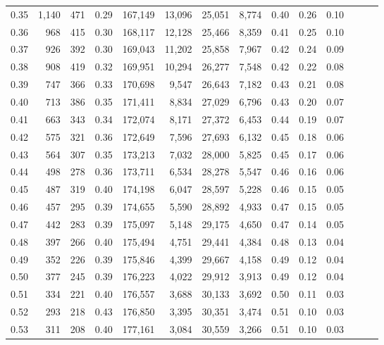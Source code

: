 \begin{tabular}{rrrrrrrrrrrrrr}
0.35 &  1,140 &    471 &  0.29 &  167,149 &   13,096 &  25,051 &   8,774 &  0.40 &  0.26 &      0.10 \\
0.36 &    968 &    415 &  0.30 &  168,117 &   12,128 &  25,466 &   8,359 &  0.41 &  0.25 &      0.10 \\
0.37 &    926 &    392 &  0.30 &  169,043 &   11,202 &  25,858 &   7,967 &  0.42 &  0.24 &      0.09 \\
0.38 &    908 &    419 &  0.32 &  169,951 &   10,294 &  26,277 &   7,548 &  0.42 &  0.22 &      0.08 \\
0.39 &    747 &    366 &  0.33 &  170,698 &    9,547 &  26,643 &   7,182 &  0.43 &  0.21 &      0.08 \\
0.40 &    713 &    386 &  0.35 &  171,411 &    8,834 &  27,029 &   6,796 &  0.43 &  0.20 &      0.07 \\
0.41 &    663 &    343 &  0.34 &  172,074 &    8,171 &  27,372 &   6,453 &  0.44 &  0.19 &      0.07 \\
0.42 &    575 &    321 &  0.36 &  172,649 &    7,596 &  27,693 &   6,132 &  0.45 &  0.18 &      0.06 \\
0.43 &    564 &    307 &  0.35 &  173,213 &    7,032 &  28,000 &   5,825 &  0.45 &  0.17 &      0.06 \\
0.44 &    498 &    278 &  0.36 &  173,711 &    6,534 &  28,278 &   5,547 &  0.46 &  0.16 &      0.06 \\
0.45 &    487 &    319 &  0.40 &  174,198 &    6,047 &  28,597 &   5,228 &  0.46 &  0.15 &      0.05 \\
0.46 &    457 &    295 &  0.39 &  174,655 &    5,590 &  28,892 &   4,933 &  0.47 &  0.15 &      0.05 \\
0.47 &    442 &    283 &  0.39 &  175,097 &    5,148 &  29,175 &   4,650 &  0.47 &  0.14 &      0.05 \\
0.48 &    397 &    266 &  0.40 &  175,494 &    4,751 &  29,441 &   4,384 &  0.48 &  0.13 &      0.04 \\
0.49 &    352 &    226 &  0.39 &  175,846 &    4,399 &  29,667 &   4,158 &  0.49 &  0.12 &      0.04 \\
0.50 &    377 &    245 &  0.39 &  176,223 &    4,022 &  29,912 &   3,913 &  0.49 &  0.12 &      0.04 \\
0.51 &    334 &    221 &  0.40 &  176,557 &    3,688 &  30,133 &   3,692 &  0.50 &  0.11 &      0.03 \\
0.52 &    293 &    218 &  0.43 &  176,850 &    3,395 &  30,351 &   3,474 &  0.51 &  0.10 &      0.03 \\
0.53 &    311 &    208 &  0.40 &  177,161 &    3,084 &  30,559 &   3,266 &  0.51 &  0.10 &      0.03 \\

\end{tabular}
